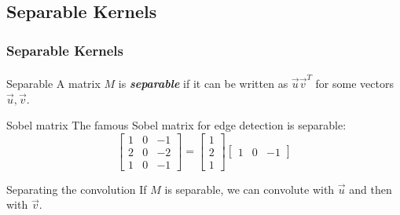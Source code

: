 \documentclass[11pt,handout]{beamer}             %
\newcommand{\emphasis}[1]{\textbf{\textit{#1}}}
\begin{document}
\subsection{Separable Kernels}
\begin{frame}
\frametitle{Separable Kernels}
\framesubtitle{}
\begin{alertblock}{Separable}
  A matrix \( M \) is \emphasis{separable} if it can be written as
  \( \vec{u} \vec{v}^T \) for some vectors \( \vec{u}, \vec{v} \).
\end{alertblock}
\pause
\begin{exampleblock}{Sobel matrix}
  The famous Sobel matrix for edge detection is separable:
  \[
    \begin{bmatrix}
      1 & 0 & -1 \\
      2 & 0 & -2 \\
      1 & 0 & -1
    \end{bmatrix}
    =
    \begin{bmatrix}
      1 \\
      2 \\ 
      1
    \end{bmatrix}
    \begin{bmatrix}
      1 & 0 & -1
    \end{bmatrix}
  \]
\end{exampleblock}
\pause
\begin{block}{Separating the convolution}
  If \( M \) is separable, we can convolute with
  \( \vec{u} \) and then with \( \vec{v} \).
\end{block}
\end{frame}
\end{document}
